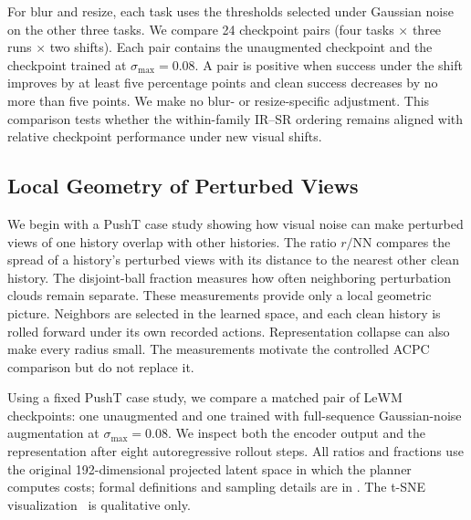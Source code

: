 \documentclass[10pt]{article}
\newcommand{\stdmax}{\ensuremath{\sigma_{\max}}}
\begin{document}
For blur and resize, each task uses the thresholds selected under Gaussian
noise on the other three tasks. We compare 24 checkpoint pairs (four tasks
$\times$ three
runs $\times$ two shifts). Each pair contains the unaugmented checkpoint and
the checkpoint trained at $\stdmax{}=0.08$. A pair is positive when success
under the shift improves by at least five percentage points and clean success
decreases by no more than five points. We make no blur- or resize-specific
adjustment. This comparison tests whether the within-family IR--SR ordering
remains aligned with relative checkpoint performance under new visual shifts.

\subsection{Local Geometry of Perturbed Views}
\label{sec:exp-local-geometry}

We begin with a PushT case study showing how visual noise can make perturbed
views of one history overlap with other histories. The ratio
$r/\mathrm{NN}$ compares the spread of a history's perturbed views with its
distance to the nearest other clean history. The disjoint-ball fraction
measures how often neighboring perturbation clouds remain separate. These
measurements provide only a local geometric picture. Neighbors are selected
in the learned space, and each clean history is rolled forward under its own
recorded actions. Representation collapse can also make every radius small.
The measurements motivate the controlled ACPC comparison but do not replace
it.

Using a fixed PushT case study, we compare a matched pair of LeWM
checkpoints: one unaugmented and one trained with full-sequence Gaussian-noise
augmentation at $\stdmax{}=0.08$. We inspect both the encoder output and the
representation after eight autoregressive rollout steps. All ratios and
fractions use the original 192-dimensional projected latent space in which
the planner computes costs; formal definitions and sampling details are in
. The t-SNE
visualization~\cite{vandermaaten2008tsne} is qualitative only.
\end{document}
